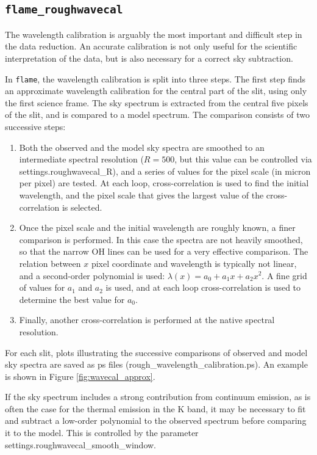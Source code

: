 \documentclass[a4paper]{article}
\newcommand{\flame}{\texttt{flame}}
\begin{document}
\subsection{\texttt{flame\_roughwavecal}}

The wavelength calibration is arguably the most important and difficult step in the data reduction. An accurate calibration is not only useful for the scientific interpretation of the data, but is also necessary for a correct sky subtraction.

In \flame, the wavelength calibration is split into three steps. The first step finds an approximate wavelength calibration for the central part of the slit, using only the first science frame. The sky spectrum is extracted from the central five pixels of the slit, and is compared to a model spectrum. The comparison consists of two successive steps:
\begin{enumerate}
\item Both the observed and the model sky spectra are smoothed to an intermediate spectral resolution ($R=500$, but this value can be controlled via settings.roughwavecal\_R), and a series of values for the pixel scale (in micron per pixel) are tested. At each loop, cross-correlation is used to find the initial wavelength, and the pixel scale that gives the largest value of the cross-correlation is selected.
\item Once the pixel scale and the initial wavelength are roughly known, a finer comparison is performed. In this case the spectra are not heavily smoothed, so that the narrow OH lines can be used for a very effective comparison. The relation between $x$ pixel coordinate and wavelength is typically not linear, and a second-order polynomial is used: $\lambda(x) = a_0 + a_1 x + a_2 x^2$. A fine grid of values for $a_1$ and $a_2$ is used, and at each loop cross-correlation is used to determine the best value for $a_0$.
\item Finally, another cross-correlation is performed at the native spectral resolution.
\end{enumerate}

For each slit, plots illustrating the successive comparisons of observed and model sky spectra are saved as ps files (rough\_wavelength\_calibration.ps). An example is shown in Figure \ref{fig:wavecal_approx}.

If the sky spectrum includes a strong contribution from continuum emission, as is often the case for the thermal emission in the K band, it may be necessary to fit and subtract a low-order polynomial to the observed spectrum before comparing it to the model. This is controlled by the parameter settings.roughwavecal\_smooth\_window.
\end{document}
